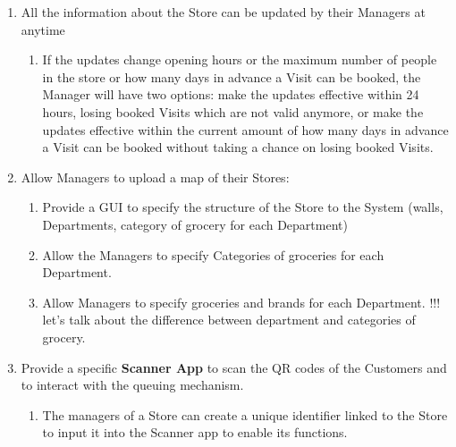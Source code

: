 \documentclass[a4paper, 10pt, oneside]{article}
\newcommand*{\lorenzo}[1]{\textcolor{BurntOrange}{#1}}
\begin{document}
\begin{enumerate}[align=left]
        \item \label{req:man:whenToUpdate}All the information about the Store can be updated by their Managers at anytime
    \begin{enumerate}[label={-}]
        \item \label{req:man:whenToUpdate:whenEffective}If the updates change opening hours or the maximum number of people in the store or how many days in advance a Visit can be booked, the Manager will have two options: make the updates effective within 24 hours, losing booked Visits which are not valid anymore, or make the updates effective within the current amount of how many days in advance a Visit can be booked without taking a chance on losing booked Visits.
    \end{enumerate}
    
    \item \label{req:man:uploadMap}Allow Managers to upload a map of their Stores:
    \begin{enumerate}[label={-}]
        \item \label{req:man:uploadMap:GUI}Provide a GUI to specify the structure of the Store to the System (walls, Departments, category of grocery for each Department)
        \item \label{req:man:uploadMap:specCategories}Allow the Managers to specify Categories of groceries for each Department.
        \item \label{req:man:uploadMap:specInCategories}Allow Managers to specify groceries and brands for each Department. \lorenzo{!!! let's talk about the difference between department and categories of grocery.}
    \end{enumerate}
    
    \item \label{req:scannerApp}Provide a specific \textbf{Scanner App} to scan the QR codes of the Customers and to interact with the queuing mechanism.
    \begin{enumerate}[label={-}]
        \item \label{req:scannerApp:createCode}The managers of a Store can create a unique identifier linked to the Store to input it into the Scanner app to enable its functions.
    \end{enumerate}
    

\end{enumerate}
\end{document}
